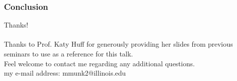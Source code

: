
\begin{frame}
  \frametitle{Conclusion}
  Thanks! \\ \\

  Thanks to Prof. Katy Huff for generously providing her slides from previous
  seminars to use as a reference for this talk. \\

  Feel welcome to contact me regarding any additional questions. \\
  my e-mail address: mmunk2@illinois.edu
\end{frame}
